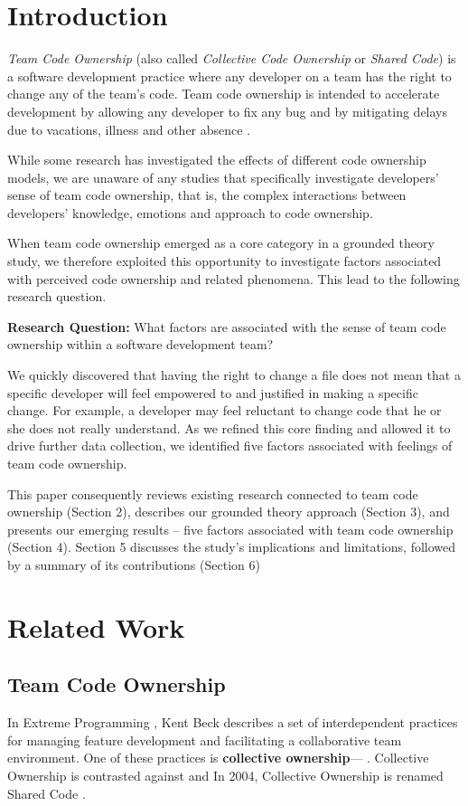 \section{Introduction}
\textit{Team Code Ownership} (also called \textit{Collective Code Ownership} or \textit{Shared Code}) is a software development practice where any developer on a team has the right to change any of the team's code. Team code ownership is intended to accelerate development by allowing any developer to fix any bug and by mitigating delays due to vacations, illness and other absence \cite{ExtremeProgramming2004}.
 
While some research has investigated the effects of different code ownership models, we are unaware of any studies that specifically investigate developers' sense of team code ownership, that is, the complex interactions between developers' knowledge, emotions and approach to code ownership.  

When team code ownership emerged as a core category in a grounded theory study, we therefore exploited this opportunity to investigate factors associated with perceived code ownership and related phenomena. This lead to the following research question. 

\textbf{Research Question:} What factors are associated with the sense of team code ownership within a software development team?

We quickly discovered that having the right to change a file does not mean that a specific developer will feel empowered to and justified in making a specific change. For example, a developer may feel reluctant to change code that he or she does not really understand. As we refined this core finding and allowed it to drive further data collection, we identified five factors associated with feelings of team code ownership. 

This paper consequently reviews existing research connected to team code ownership (Section 2), describes our grounded theory approach (Section 3), and presents our emerging results – five factors associated with team code ownership (Section 4). Section 5 discusses the study's implications and limitations, followed by a summary of its contributions (Section 6)
\section{Related Work}
\label{RelatedWork}
\subsection{Team Code Ownership}
In Extreme Programming \cite{ExtremeProgramming2004}, Kent Beck describes a set of interdependent practices for managing feature development and facilitating a collaborative team environment. One of these practices is \textbf{collective ownership}--- \cite{ExtremeProgramming2000}. Collective Ownership is contrasted against  and  In 2004, Collective Ownership is renamed Shared Code \cite{ExtremeProgramming2004}.

